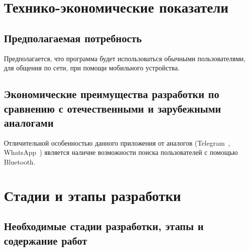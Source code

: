 \documentclass[techtask]{espd}
\begin{document}
\section{Технико-экономические показатели}
\subsection{Предполагаемая потребность}
Предполагается, что программа будет использоваться обычными пользователями, для общения по сети, при помощи мобильного устройства.

\subsection{Экономические преимущества разработки по сравнению с отечественными и зарубежными аналогами}
Отличительной особенностью данного приложения от аналогов (Telegram~\cite{telegram}, WhatsApp~\cite{whatsapp}) является наличие возможности поиска пользователей с помощью Bluetooth.

\section{Стадии и этапы разработки}
\subsection{Необходимые стадии разработки, этапы и содержание работ}
\end{document}
